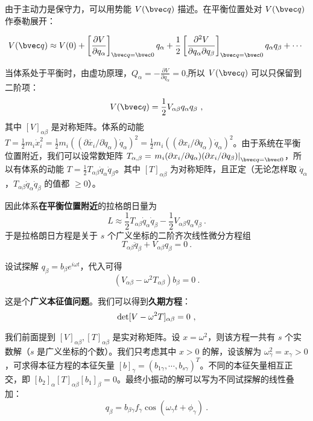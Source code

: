 由于主动力是保守力，可以用势能 $V(\bvec q)$ 描述。在平衡位置处对 $V(\bvec q)$ 作泰勒展开：

\begin{equation}
V(\bvec q)\approx V(0)+\left[\frac{\partial V}{\partial q_\alpha}\right]_{\bvec q=\bvec 0} q_\alpha+\frac{1}{2}\left[\frac{\partial^2V}{\partial q_\alpha\partial q_\beta}\right]_{\bvec q=\bvec 0} q_\alpha q_\beta+\cdots~
\end{equation}

当体系处于平衡时，由虚功原理，$Q_\alpha=-\frac{\partial V}{\partial q_\alpha}=0$,所以 $V(\bvec q)$ 可以只保留到二阶项：
\begin{equation}
V(\bvec q)=\frac{1}{2}V_{\alpha\beta}q_\alpha q_\beta~,
\end{equation}
其中 $[V]_{\alpha\beta}$ 是对称矩阵。体系的动能 $T=\frac{1}{2}m_i\dot{x}_i^2=\frac{1}{2}m_i((\partial \dot{x_i} / \partial \dot{q}_\alpha) \dot{q}_\alpha)^2= \frac{1}{2}m_i((\partial x_i/\partial q_\alpha)\dot{q}_\alpha)^2$。由于系统在平衡位置附近，我们可以设常数矩阵 $T_{\alpha,\beta}=\left.m_i(\partial x_i/\partial q_\alpha)(\partial x_i/\partial q_\beta)\right|_{\bvec q=\bvec 0}$，所以有体系的动能 $T=\frac{1}{2}T_{\alpha\beta} \dot{q}_\alpha \dot{q}_\beta$。其中 $[T]_{\alpha\beta}$ 为对称矩阵，且正定（无论怎样取 $\dot{q}_\alpha$，$T_{\alpha\beta} \dot{q}_\alpha \dot{q}_\beta$ 的值都 $\ge0$）。

因此体系\textbf{在平衡位置附近}的拉格朗日量为
\begin{equation}
L\approx\frac{1}{2}T_{\alpha\beta}\dot{q}_\alpha \dot{q}_\beta-\frac{1}{2}V_{\alpha\beta}q_\alpha q_\beta~.
\end{equation}
于是拉格朗日方程是关于 $s$ 个广义坐标的二阶齐次线性微分方程组
\begin{equation}
T_{\alpha\beta}\ddot{q}_\beta+V_{\alpha\beta}q_\beta=0~.
\end{equation}

设试探解 $q_\beta=b_\beta e^{i\omega t}$，代入可得
\begin{equation}
(V_{\alpha\beta} - \omega^2 T_{\alpha\beta}) b_\beta = 0~.
\end{equation}

这是个\textbf{广义本征值问题}。我们可以得到\textbf{久期方程}：
\begin{equation}
{\rm{det}}[V-\omega^2 T]_{\alpha\beta}=0 ~,
\end{equation}

我们前面提到 $[V]_{\alpha\beta},[T]_{\alpha\beta}$ 是实对称矩阵。设 $x=\omega^2$，则该方程一共有 $s$ 个实数解（$s$ 是广义坐标的个数）。我们只考虑其中 $x>0$ 的解，设该解为 $\omega_\gamma^2=x_\gamma>0$，可求得本征方程的本征矢量 $[b]_\gamma=(b_{1\gamma},\cdots,b_{s\gamma})^T$。不同的本征矢量相互正交，即 $[b_2]_{\alpha}[T]_{\alpha\beta} [b_1]_{\beta}=0$。最终小振动的解可以写为不同试探解的线性叠加：
\begin{equation}
q_\beta = b_{\beta\gamma}f_\gamma \cos(\omega_\gamma t + \phi_\gamma)~.
\end{equation}


